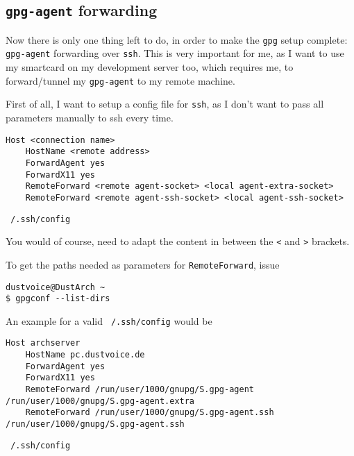 \documentclass[10pt]{dustdoc}
\begin{document}
\subsection{\texttt{gpg-agent} forwarding}
\label{sec:gpg-agent-forwarding}

Now there is only one thing left to do, in order to make the \texttt{gpg} setup complete: \texttt{gpg-agent} forwarding over \texttt{ssh}.
This is very important for me, as I want to use my smartcard on my development server too, which requires me, to forward/tunnel my \texttt{gpg-agent} to my remote machine.

First of all, I want to setup a config file for \texttt{ssh}, as I don’t want to pass all parameters manually to ssh every time.

\begin{mintedlisting}
    \begin{verbatim}
Host <connection name>
    HostName <remote address>
    ForwardAgent yes
    ForwardX11 yes
    RemoteForward <remote agent-socket> <local agent-extra-socket>
    RemoteForward <remote agent-ssh-socket> <local agent-ssh-socket>
    \end{verbatim}

    \caption{\texttt{~/.ssh/config}}
\end{mintedlisting}

\begin{NOTE}
    You would of course, need to adapt the content in between the \texttt{<} and \texttt{>} brackets.

    To get the paths needed as parameters for \texttt{RemoteForward}, issue

    \begin{verbatim}
dustvoice@DustArch ~
$ gpgconf --list-dirs
    \end{verbatim}
\end{NOTE}

\begin{example}
    An example for a valid \texttt{~/.ssh/config} would be

    \begin{mintedlisting}
        \begin{verbatim}
Host archserver
    HostName pc.dustvoice.de
    ForwardAgent yes
    ForwardX11 yes
    RemoteForward /run/user/1000/gnupg/S.gpg-agent /run/user/1000/gnupg/S.gpg-agent.extra
    RemoteForward /run/user/1000/gnupg/S.gpg-agent.ssh /run/user/1000/gnupg/S.gpg-agent.ssh
        \end{verbatim}

        \caption{\texttt{~/.ssh/config}}
    \end{mintedlisting}
\end{example}
\end{document}
